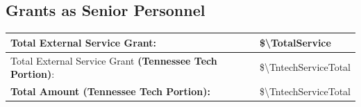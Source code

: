 \hspace{2em}
\subsection{Grants as Senior Personnel}

\begin{table}[!h]
    \centering
    \begin{tabular}{|l|l|}
    \hline
        
    \hline
        Total External Service Grant: &  \$\num[group-separator={,}]{\TotalService} \\
    \hline        
        Total External Service Grant \textbf{(Tennessee Tech Portion)}: &  \$\num[group-separator={,}]{\TntechServiceTotal} \\
    \hline
        \textbf{Total Amount (Tennessee Tech Portion):} &  \$\num[group-separator={,}]{\TntechServiceTotal}\\
    \hline   
    \end{tabular}
    \label{tab:my_label}
\end{table}

\hspace{2em}

